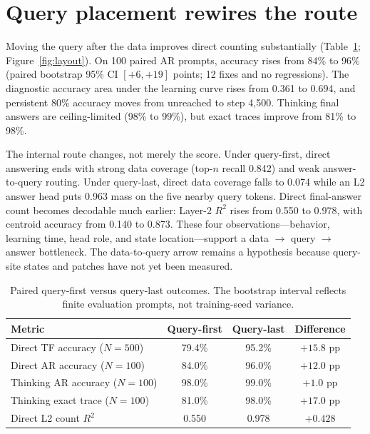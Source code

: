 \documentclass[11pt]{article}
\begin{document}
\section{Query placement rewires the route}
\label{sec:layout}

Moving the query after the data improves direct counting substantially (Table~\ref{tab:layout}; Figure~\ref{fig:layout}). On 100 paired AR prompts, accuracy rises from 84\% to 96\% (paired bootstrap 95\% CI $[+6,+19]$ points; 12 fixes and no regressions). The diagnostic accuracy area under the learning curve rises from 0.361 to 0.694, and persistent 80\% accuracy moves from unreached to step 4,500. Thinking final answers are ceiling-limited (98\% to 99\%), but exact traces improve from 81\% to 98\%.

The internal route changes, not merely the score. Under query-first, direct answering ends with strong data coverage (top-$n$ recall 0.842) and weak answer-to-query routing. Under query-last, direct data coverage falls to 0.074 while an L2 answer head puts 0.963 mass on the five nearby query tokens. Direct final-answer count becomes decodable much earlier: Layer-2 $R^2$ rises from 0.550 to 0.978, with centroid accuracy from 0.140 to 0.873. These four observations---behavior, learning time, head role, and state location---support a data $\rightarrow$ query $\rightarrow$ answer bottleneck. The data-to-query arrow remains a hypothesis because query-site states and patches have not yet been measured.

\begin{table}[t]
\caption{Paired query-first versus query-last outcomes. The bootstrap interval reflects finite evaluation prompts, not training-seed variance.}
\label{tab:layout}
\centering
\small
\begin{tabular}{lccc}
\toprule
Metric & Query-first & Query-last & Difference \\
\midrule
Direct TF accuracy ($N=500$) & 79.4\% & 95.2\% & $+15.8$ pp \\
Direct AR accuracy ($N=100$) & 84.0\% & 96.0\% & $+12.0$ pp \\
Thinking AR accuracy ($N=100$) & 98.0\% & 99.0\% & $+1.0$ pp \\
Thinking exact trace ($N=100$) & 81.0\% & 98.0\% & $+17.0$ pp \\
Direct L2 count $R^2$ & 0.550 & 0.978 & $+0.428$ \\
\bottomrule
\end{tabular}
\end{table}
\end{document}
